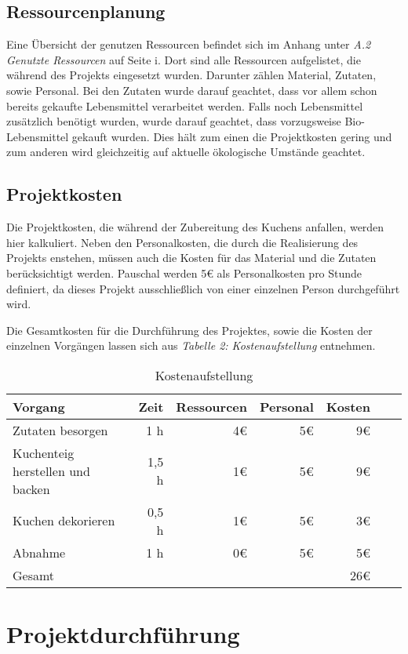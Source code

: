 \subsection{Ressourcenplanung}
Eine Übersicht der genutzen Ressourcen befindet sich im Anhang unter \emph{A.2 Genutzte Ressourcen} auf Seite i. Dort
sind alle Ressourcen aufgelistet, die während des Projekts eingesetzt wurden. Darunter
zählen Material, Zutaten, sowie Personal. Bei den Zutaten wurde darauf geachtet, dass vor allem schon bereits gekaufte Lebensmittel verarbeitet werden.
Falls noch Lebensmittel zusätzlich benötigt wurden, wurde darauf geachtet, dass vorzugsweise Bio-Lebensmittel gekauft wurden.
Dies hält zum einen die Projektkosten gering und zum anderen wird gleichzeitig auf aktuelle ökologische Umstände geachtet.

\subsection{Projektkosten}
Die Projektkosten, die während der Zubereitung des Kuchens anfallen, werden hier kalkuliert.
Neben den Personalkosten, die durch die Realisierung des Projekts enstehen, müssen auch die Kosten für das Material und die Zutaten berücksichtigt werden.
Pauschal werden 5€ als Personalkosten pro Stunde definiert, da dieses Projekt ausschließlich von einer einzelnen Person durchgeführt wird.

Die Gesamtkosten für die Durchführung des Projektes, sowie die Kosten der einzelnen Vorgängen lassen sich aus \emph{Tabelle 2: Kostenaufstellung} entnehmen.

\begin{table}[h]
    \centering
    \begin{tabular}{l*{5}{r}|r|}
        \hline
        Vorgang    & Zeit  &    Ressourcen & Personal & Kosten\\
        \hline
        Zutaten besorgen & 1 h & 4€ & 5€ & 9€\\
        Kuchenteig herstellen und backen    & 1,5 h & 1€ & 5€  & 9€ \\
        Kuchen dekorieren      & 0,5 h & 1€ & 5€ & 3€   \\
        Abnahme & 1 h & 0€ & 5€ & 5€ \\
        \hline
        Gesamt & & & & 26€ \\
        \hline
        \end{tabular}
        \caption{Kostenaufstellung}
\end{table}
\section{Projektdurchführung}
